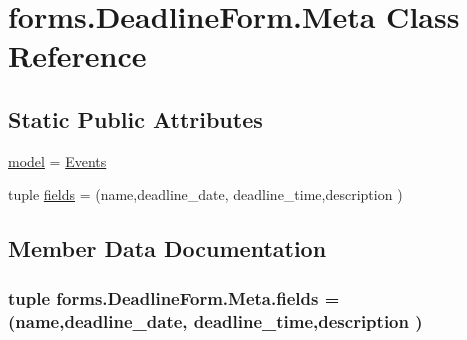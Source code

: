 \hypertarget{classforms_1_1_deadline_form_1_1_meta}{}\section{forms.\+Deadline\+Form.\+Meta Class Reference}
\label{classforms_1_1_deadline_form_1_1_meta}
\subsection*{Static Public Attributes}
\begin{DoxyCompactItemize}
\item 
\hyperlink{classforms_1_1_deadline_form_1_1_meta_a714361d72114f4856d3d60201666e30e}{model} = \hyperlink{classmodels_1_1_events}{Events}
\item 
tuple \hyperlink{classforms_1_1_deadline_form_1_1_meta_a817a9ed45442a127f6fd93224fa92697}{fields} = (\textquotesingle{}name\textquotesingle{},\textquotesingle{}deadline\+\_\+date\textquotesingle{}, \textquotesingle{}deadline\+\_\+time\textquotesingle{},\textquotesingle{}description\textquotesingle{} )
\end{DoxyCompactItemize}


\subsection{Member Data Documentation}
\subsubsection[{\texorpdfstring{fields}{fields}}]{\setlength{\rightskip}{0pt plus 5cm}tuple forms.\+Deadline\+Form.\+Meta.\+fields = (\textquotesingle{}name\textquotesingle{},\textquotesingle{}deadline\+\_\+date\textquotesingle{}, \textquotesingle{}deadline\+\_\+time\textquotesingle{},\textquotesingle{}description\textquotesingle{} )\hspace{0.3cm}{\ttfamily [static]}}\hypertarget{classforms_1_1_deadline_form_1_1_meta_a817a9ed45442a127f6fd93224fa92697}{}\label{classforms_1_1_deadline_form_1_1_meta_a817a9ed45442a127f6fd93224fa92697}
